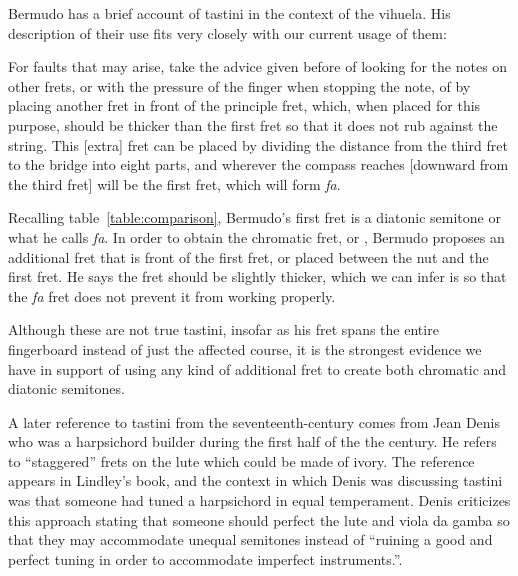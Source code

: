Bermudo has a brief account of tastini in the context of the vihuela. His description
of their use fits very closely with our current usage of them:
\begin{blocks}
For faults that may arise, take the advice given before of looking for the notes on other
frets, or with the pressure of the finger when stopping the note, of by placing another
fret in front of the principle fret, which, when placed for this purpose, should be
thicker than the first fret so that it does not rub against the string. This [extra]
fret can be placed by dividing the distance from the third fret to the bridge into eight
parts, and wherever the compass reaches [downward from the third fret] will be the first
fret, which will form \textit{fa}. \autocite[115-116]{DE:1}
\end{blocks}
Recalling table~\ref{table:comparison}, Bermudo's first fret is a diatonic semitone or what
he calls \textit{fa}. In order to obtain the chromatic fret, or , Bermudo
proposes an additional fret that is front of the first fret, or placed between the nut
and the first fret. He says the fret should be slightly thicker, which we can infer
is so that the \textit{fa} fret does not prevent it from working properly.

Although these are not true tastini, insofar as his fret spans the entire
fingerboard instead of just the affected course, it is the strongest evidence we have
in support of using any kind of additional fret to create both chromatic and diatonic semitones.

A later reference to tastini from the seventeenth-century comes from Jean Denis who
was a harpsichord builder during the first half of the the century. He refers to
``staggered'' frets on the lute which could be made of ivory. The reference appears in
Lindley's book, and the context in which Denis was discussing tastini was that
someone had tuned a harpsichord in equal temperament. Denis criticizes this approach
stating that someone should perfect the lute and viola da gamba so that they may
accommodate unequal semitones instead of ``ruining a good and perfect tuning in order to
accommodate imperfect instruments.''\autocite[47]{ML:1}.

